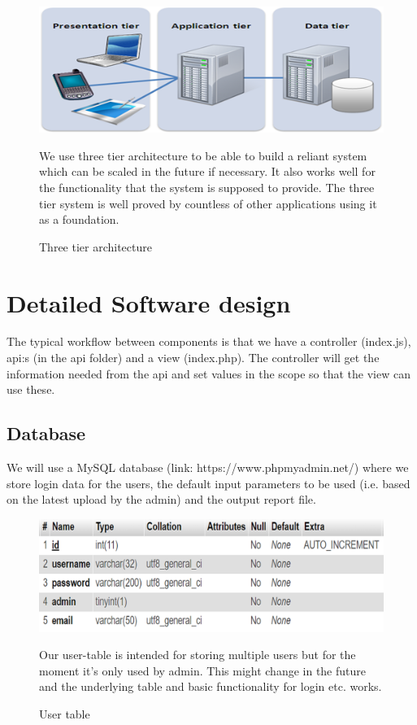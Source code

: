 \documentclass[]{article}
\begin{document}
\begin{figure}[H]
	\includegraphics[width=1.0\linewidth]{Bild3}
	\caption{Three tier architecture}
	\medskip
	\small
	We use three tier architecture to be able to build a reliant system which can be scaled in the future if necessary. It also works well for the functionality that the system is supposed to provide. The three tier system is well proved by countless of other applications using it as a foundation.
	\label{fig:Bild3}
\end{figure}

\section{Detailed Software design}
The typical workflow between components is that we have a controller (index.js), api:s (in the api folder) and a view (index.php). The controller will get the information needed from the api and set values in the scope so that the view can use these. 

\subsection{Database}
We will use a MySQL database (link: https://www.phpmyadmin.net/) where
we store login data for the users, the default input parameters to be used (i.e.
based on the latest upload by the admin) and the output report file.

\begin{figure}[H]
	\includegraphics[width=1.0\linewidth]{Bild8}
	\caption{User table}
	\medskip
	\small
	Our user-table is intended for storing multiple users but for the moment it's only used by admin. This might change in the future and the underlying table and basic functionality for login etc. works.
	\label{fig:Bild8}
\end{figure}
\end{document}
